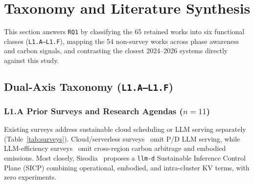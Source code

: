 \section{Taxonomy and Literature Synthesis}\label{sec:taxonomy}

This section answers \texttt{RQ1} by classifying the 65 retained works into six functional classes (\texttt{L1.A--L1.F}), mapping the 54 non-survey works across phase awareness and carbon signals, and contrasting the closest 2024--2026 systems directly against this study.

\subsection{Dual-Axis Taxonomy (\texorpdfstring{\texttt{L1.A--L1.F}}{L1.A-L1.F})}\label{subsec:taxonomy_classes}

\subsubsection{L1.A Prior Surveys and Research Agendas (\texorpdfstring{$n=11$}{n=11})}
Existing surveys address sustainable cloud scheduling or LLM serving separately (Table~\ref{tab:surveys}). Cloud/serverless surveys~\cite{hewage2026carbon,yang2025container,alam2026computing,agarwal2026serverless,besozzi2025serverless} omit P/D LLM serving, while LLM-efficiency surveys~\cite{miao2025serving,jiang2026kvcache,pan2025inference,bai2026efficiency,zhen2025taming} omit cross-region carbon arbitrage and embodied emissions. Most closely, Sisodia~\cite{sisodia2026sicp} proposes a \texttt{llm-d} Sustainable Inference Control Plane (SICP) combining operational, embodied, and intra-cluster KV terms, with zero experiments.


